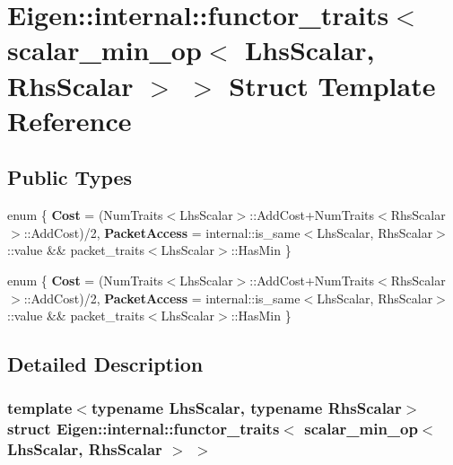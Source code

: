 \hypertarget{struct_eigen_1_1internal_1_1functor__traits_3_01scalar__min__op_3_01_lhs_scalar_00_01_rhs_scalar_01_4_01_4}{}\section{Eigen\+:\+:internal\+:\+:functor\+\_\+traits$<$ scalar\+\_\+min\+\_\+op$<$ Lhs\+Scalar, Rhs\+Scalar $>$ $>$ Struct Template Reference}
\label{struct_eigen_1_1internal_1_1functor__traits_3_01scalar__min__op_3_01_lhs_scalar_00_01_rhs_scalar_01_4_01_4}
\subsection*{Public Types}
\begin{DoxyCompactItemize}
\item 
\mbox{\label{struct_eigen_1_1internal_1_1functor__traits_3_01scalar__min__op_3_01_lhs_scalar_00_01_rhs_scalar_01_4_01_4_a323271f80d6d09ba03e88603b671ed05}} 
enum \{ {\bfseries Cost} = (Num\+Traits$<$Lhs\+Scalar$>$\+:\+:Add\+Cost+\+Num\+Traits$<$Rhs\+Scalar$>$\+:\+:Add\+Cost)/2, 
{\bfseries Packet\+Access} = internal\+:\+:is\+\_\+same$<$Lhs\+Scalar, Rhs\+Scalar$>$\+:\+:value \&\& packet\+\_\+traits$<$Lhs\+Scalar$>$\+:\+:Has\+Min
 \}
\item 
\mbox{\label{struct_eigen_1_1internal_1_1functor__traits_3_01scalar__min__op_3_01_lhs_scalar_00_01_rhs_scalar_01_4_01_4_a25df91889c7c39c1d660fce497d2a0d0}} 
enum \{ {\bfseries Cost} = (Num\+Traits$<$Lhs\+Scalar$>$\+:\+:Add\+Cost+\+Num\+Traits$<$Rhs\+Scalar$>$\+:\+:Add\+Cost)/2, 
{\bfseries Packet\+Access} = internal\+:\+:is\+\_\+same$<$Lhs\+Scalar, Rhs\+Scalar$>$\+:\+:value \&\& packet\+\_\+traits$<$Lhs\+Scalar$>$\+:\+:Has\+Min
 \}
\end{DoxyCompactItemize}


\subsection{Detailed Description}
\subsubsection*{template$<$typename Lhs\+Scalar, typename Rhs\+Scalar$>$\newline
struct Eigen\+::internal\+::functor\+\_\+traits$<$ scalar\+\_\+min\+\_\+op$<$ Lhs\+Scalar, Rhs\+Scalar $>$ $>$}



